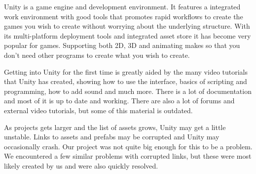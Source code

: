 
Unity is a game engine and development environment.
It features a integrated work environment with good tools that promotes rapid workflows to create the games you wish to create without worrying about the underlying structure.
With its multi-platform deployment tools and integrated asset store it has become very popular for games.
Supporting both 2D, 3D and animating makes so that you don't need other programs to create what you wish to create.

Getting into Unity for the first time is greatly aided by the many video tutorials that Unity has created, showing how to use the interface, basics of scripting and programming, how to add sound and much more. There is a lot of documentation and most of it is up to date and working. There are also a lot of forums and external video tutorials, but some of this material is outdated.

As projects gets larger and the list of assets grows, Unity may get a little unstable. Links to assets and \gls{prefab}s may be corrupted and Unity may occasionally crash. Our project was not quite big enough for this to be a problem. We encountered a few similar problems with corrupted links, but these were most likely created by us and were also quickly resolved. 

